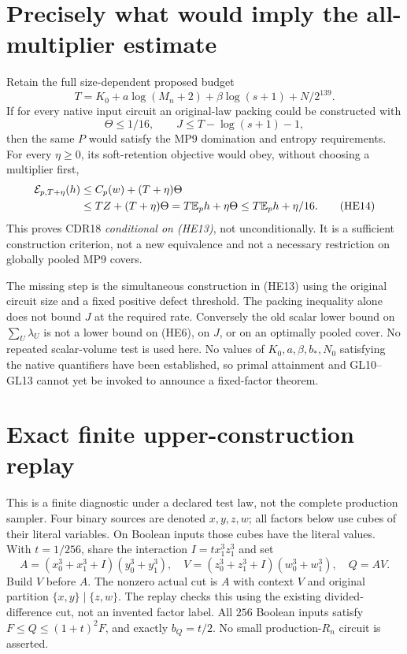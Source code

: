 \documentclass[11pt]{article}
\newcommand{\E}{\mathbb E}
\begin{document}
\section{Precisely what would imply the all-multiplier estimate}
Retain the full size-dependent proposed budget
\[
 T=K_0+a\log(M_n+2)+\beta\log(s+1)+N/2^{139}.          \tag{HE12}
\]
If for every native input circuit an original-law packing could
be constructed with
\[
              \Theta\le1/16,\qquad
              J\le T-\log(s+1)-1,                    \tag{HE13}
\]
then the same $P$ would satisfy the MP9 domination and entropy
requirements. For every $\eta\ge0$, its soft-retention objective
would obey, without choosing a multiplier first,
\[
 \begin{split}
 {\cal E}_{p,T+\eta}(h)
 &\le C_p(w)+(T+\eta)\Theta\\
 &\le TZ+(T+\eta)\Theta
   =T\E_ph+\eta\Theta
   \le T\E_ph+\eta/16.                               \tag{HE14}
 \end{split}
\]
This proves CDR18 \emph{conditional on (HE13)}, not unconditionally.
It is a sufficient construction criterion, not a new equivalence
and not a necessary restriction on globally pooled MP9 covers.

The missing step is the simultaneous construction in (HE13) using
the original circuit size and a fixed positive defect threshold.
The packing inequality alone does not bound $J$ at the required
rate. Conversely the old scalar lower bound on
$\sum_U\lambda_U$ is not a lower bound on (HE6), on $J$, or on an
optimally pooled cover. No repeated scalar-volume test is used
here. No values of $K_0,a,\beta,b_*,N_0$ satisfying the native
quantifiers have been established, so primal attainment and
GL10--GL13 cannot yet be invoked to announce a fixed-factor theorem.

\section{Exact finite upper-construction replay}
This is a finite diagnostic under a declared test law, not the
complete production sampler. Four binary sources are denoted
$x,y,z,w$; all factors below use cubes of their literal variables.
On Boolean inputs those cubes have the literal values. With
$t=1/256$, share the interaction $I=t x_1^3z_1^3$ and set
\[
 A=(x_0^3+x_1^3+I)(y_0^3+y_1^3),\quad
 V=(z_0^3+z_1^3+I)(w_0^3+w_1^3),\quad Q=AV.          \tag{HE15}
\]
Build $V$ before $A$. The nonzero actual cut is $A$ with context
$V$ and original partition $\{x,y\}\mid\{z,w\}$.
The replay checks this using the existing divided-difference cut,
not an invented factor label. All $256$ Boolean inputs satisfy
$F\le Q\le(1+t)^2F$, and exactly $b_Q=t/2$.
No small production-$R_n$ circuit is asserted.
\end{document}
